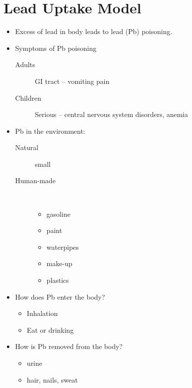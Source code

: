 \documentclass[
	date={September 23{,} 2024},
	month={09},
	day={23}
]{math486notes}
\begin{document}
\section{Lead Uptake Model}\label{sec:lead-uptake-model}
\begin{itemize}
	\item Excess of lead in body leads to lead (Pb) poisoning.
	\item Symptoms of Pb poisoning
	\begin{description}
		\item[Adults] GI tract -- vomiting pain
		\item[Children] Serious -- central nervous system disorders, anemia
	\end{description}
	\item Pb in the environment:
	\begin{description}
		\item[Natural] small
		\item[Human-made]~
		\begin{itemize}
			\item gasoline
			\item paint
			\item waterpipes
			\item make-up
			\item plastics
		\end{itemize}
	\end{description}
	\item How does Pb enter the body?
	\begin{itemize}
		\item Inhalation
		\item Eat or drinking
	\end{itemize}
	\item How is Pb removed from the body?
	\begin{itemize}
		\item urine
		\item hair, nails, sweat
	\end{itemize}
\end{itemize}
\end{document}
